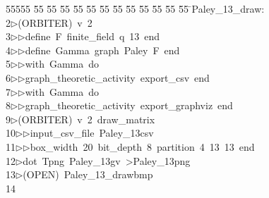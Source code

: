 %
%
\begin{tabbing}
55555 \= 55 \= 55 \= 55 \= 55 \= 55 \= 55 \= 55 \= 55 \= 55 \= 55 \= 55 \= 55 \= \>Paley\_13\_draw:\\[0pt]
2\>$\triangleright$\>(ORBITER)\ v\ 2\ \\[0pt]
3\>$\triangleright$\>$\triangleright$\>define\ F\ finite\_field\ q\ 13\ end\ \\[0pt]
4\>$\triangleright$\>$\triangleright$\>define\ Gamma\ graph\ Paley\ F\ end\ \\[0pt]
5\>$\triangleright$\>$\triangleright$\>with\ Gamma\ do\ \\[0pt]
6\>$\triangleright$\>$\triangleright$\>graph\_theoretic\_activity\ export\_csv\ end\ \\[0pt]
7\>$\triangleright$\>$\triangleright$\>with\ Gamma\ do\ \\[0pt]
8\>$\triangleright$\>$\triangleright$\>graph\_theoretic\_activity\ export\_graphviz\ end\\[0pt]
9\>$\triangleright$\>(ORBITER)\ v\ 2\ draw\_matrix\ \\[0pt]
10\>$\triangleright$\>$\triangleright$\>input\_csv\_file\ Paley\_13csv\ \\[0pt]
11\>$\triangleright$\>$\triangleright$\>box\_width\ 20\ bit\_depth\ 8\ partition\ 4\ 13\ 13\ end\\[0pt]
12\>$\triangleright$\>dot\ Tpng\ Paley\_13gv\ {\textgreater}Paley\_13png\\[0pt]
13\>$\triangleright$\>(OPEN)\ Paley\_13\_drawbmp\\[0pt]
14\>\end{tabbing}
